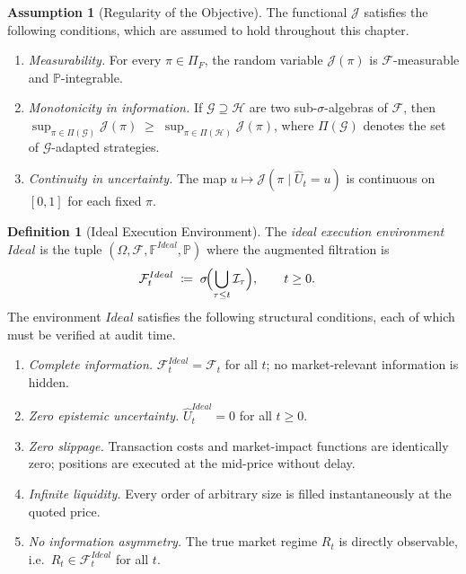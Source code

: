 \documentclass[12pt,openany]{book}
\numberwithin{equation}{chapter}
\theoremstyle{plain}
\theoremstyle{definition}
\newtheorem{definition}[theorem]{Definition}
\newtheorem{assumption}[theorem]{Assumption}
\theoremstyle{remark}
\numberwithin{equation}{chapter}
\theoremstyle{plain}
\newcommand{\Ideal}{\mathcal{E}_{I}}
\def\Ideal{Ideal}%
\begin{document}
\begin{assumption}[Regularity of the Objective]
\label{asm:obj-regularity}
The functional $\mathcal{J}$ satisfies the following conditions,
which are assumed to hold throughout this chapter.
\begin{enumerate}
  \item \emph{Measurability.}  For every $\pi \in \Pi_F$,
        the random variable $\mathcal{J}(\pi)$ is
        $\mathcal{F}$-measurable and $\mathbb{P}$-integrable.
  \item \emph{Monotonicity in information.}  If
        $\mathcal{G} \supseteq \mathcal{H}$ are two
        sub-$\sigma$-algebras of $\mathcal{F}$, then
        $\sup_{\pi \in \Pi(\mathcal{G})}\mathcal{J}(\pi)
        \;\geq\;
        \sup_{\pi \in \Pi(\mathcal{H})}\mathcal{J}(\pi)$,
        where $\Pi(\mathcal{G})$ denotes the set of
        $\mathcal{G}$-adapted strategies.
  \item \emph{Continuity in uncertainty.}  The map
        $u \mapsto \mathcal{J}(\pi \mid \hat{U}_t = u)$
        is continuous on $[0,1]$ for each fixed $\pi$.
\end{enumerate}
\end{assumption}

\begin{definition}[Ideal Execution Environment]
\label{def:ideal}
\label{def:ideal-filtration}
The \emph{ideal execution environment} $\Ideal$ is the tuple
$(\Omega, \mathcal{F}, \mathbb{F}^{\Ideal}, \mathbb{P})$ where
the augmented filtration is
\begin{align}
  \mathcal{F}_t^{\Ideal}
  &\;\coloneqq\;
  \sigma\!\Bigl(\bigcup_{\tau \leq t} \mathcal{I}_\tau\Bigr),
  \qquad t \geq 0.
  \label{eq:ideal-filtration}
\end{align}
The environment $\Ideal$ satisfies the following structural
conditions, each of which must be verified at audit time.
\begin{enumerate}
  \item \emph{Complete information.}
        $\mathcal{F}_t^{\Ideal} = \mathcal{F}_t$ for all $t$;
        no market-relevant information is hidden.
  \item \emph{Zero epistemic uncertainty.}
        $\hat{U}_t^{\Ideal} = 0$ for all $t \geq 0$.
  \item \emph{Zero slippage.}
        Transaction costs and market-impact functions are
        identically zero; positions are executed at the
        mid-price without delay.
  \item \emph{Infinite liquidity.}
        Every order of arbitrary size is filled instantaneously
        at the quoted price.
  \item \emph{No information asymmetry.}
        The true market regime $R_t$ is directly observable,
        i.e.\ $R_t \in \mathcal{F}_t^{\Ideal}$ for all $t$.
\end{enumerate}
\end{definition}
\end{document}
